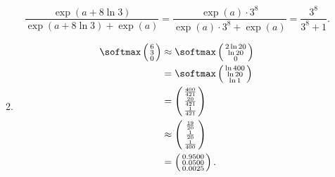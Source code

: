 \documentclass{article}
\begin{document}
\begin{enumerate}
\begin{enumerate}
    \begin{equation*}
    \frac{\exp(a + 8\ln 3)}{\exp(a + 8\ln 3)+\exp(a)} = \frac{\exp(a) \cdot 3^8}{\exp(a) \cdot 3^8 + \exp(a)} = \frac{3^8}{3^8 + 1}.
    \end{equation*}
    
    \item \begin{align*}
              \softmax \left(\begin{smallmatrix} 
                          6               \\ 3              \\ 0 
                       \end{smallmatrix} \right) 
    & \approx \softmax \left(\begin{smallmatrix} 
                          2 \ln 20        \\ \ln 20         \\ 0 
                       \end{smallmatrix} \right) \\
    & =       \softmax \left(\begin{smallmatrix} 
                          \ln 400         \\ \ln 20         \\ \ln 1 
                       \end{smallmatrix} \right) \\
    & =                \left(\begin{smallmatrix} 
                          \frac{400}{421} \\ \frac{20}{421} \\ \frac{1}{421} 
                       \end{smallmatrix} \right) \\
    & \approx          \left(\begin{smallmatrix} 
                          \frac{19}{20}   \\ \frac{1}{20}   \\ \frac{1}{400} 
                       \end{smallmatrix} \right) \\
    & =                \left(\begin{smallmatrix} 
                          0.9500          \\ 0.0500         \\ 0.0025 
                       \end{smallmatrix} \right).
    \end{align*}
                     

\end{enumerate}
\end{enumerate}
\end{document}
